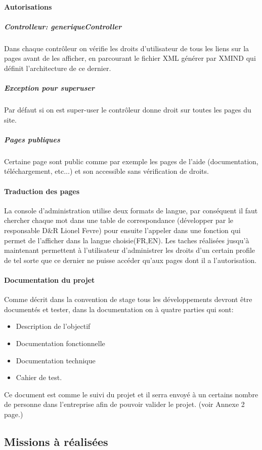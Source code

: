 \paragraph{Autorisations}
\subparagraph{Controlleur: generiqueController} 
Dans chaque contrôleur on vérifie les droits d'utilisateur de tous les liens sur la pages avant de les afficher, en parcourant
le fichier XML générer par XMIND qui définit l'architecture de ce dernier.
\subparagraph{Exception pour superuser}
Par défaut si on est super-user le contrôleur donne droit sur toutes les pages du site.
\subparagraph{Pages publiques} 
Certaine page sont public comme par exemple les pages de l'aide (documentation, téléchargement, etc...) et son
accessible sans vérification de droits.

\paragraph{Traduction des pages}
La console d'administration utilise deux formats de langue, par conséquent il faut chercher chaque mot dans une table de correspondance (développer par le responsable D\&R Lionel Fevre) pour ensuite l'appeler dans une fonction qui permet de l'afficher dans la langue choisie(FR,EN).
Les taches réalisées jusqu'à maintenant permettent à l'utilisateur d'administrer les droits d'un certain profile de tel sorte que ce dernier ne puisse accéder qu'aux pages  dont il a l'autorisation. 

\paragraph{Documentation du projet}
Comme décrit dans la convention de stage tous les développements devront être documentés et tester, dans la documentation on à quatre parties qui sont:
\begin{itemize}
\item Description de l'objectif
\item Documentation fonctionnelle
\item Documentation technique
\item Cahier de test.
\end{itemize}
Ce document est comme le suivi du projet et il serra envoyé à un certains nombre de personne dans l'entreprise afin de pouvoir valider le projet. (voir Annexe 2 page.\pageref{documentation})
\subsection{Missions à réalisées}
